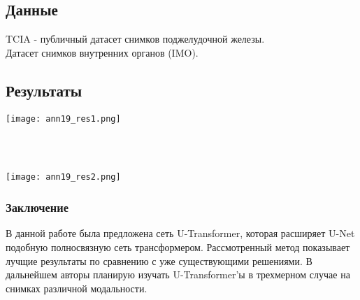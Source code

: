 \subsection*{Данные}
TCIA - публичный датасет снимков поджелудочной железы.\\
Датасет снимков внутренних органов (IMO).
\subsection*{Результаты}

\begin{minipage}{1.0\linewidth}
    \begin{center}
        \texttt{[image: ann19\_res1.png]} \\
    \end{center}
    
\end{minipage}
\\
\\
\begin{minipage}{1.0\linewidth}
    \begin{center}
        \texttt{[image: ann19\_res2.png]} \\
    \end{center}
    
\end{minipage} 

\subsubsection*{Заключение}
В данной работе была предложена сеть U-Transformer, которая расширяет U-Net подобную 
полносвязную сеть трансформером. Рассмотренный метод показывает лучщие результаты 
по сравнению с уже существующими решениями. В дальнейшем авторы планирую изучать 
U-Transformer'ы в трехмерном случае на снимках различной модальности.